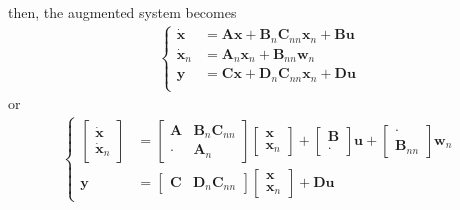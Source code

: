 \documentclass[letterpaper,10pt,english]{jupyterBook}
\begin{document}
then, the augmented system becomes
\begin{equation*}
\begin{split}\left\{\begin{aligned}
  \dot{\mathbf{x}} & = \mathbf{A} \mathbf{x} + \mathbf{B}_n \mathbf{C}_{nn} \mathbf{x}_n + \mathbf{B} \mathbf{u} \\
  \dot{\mathbf{x}}_n & = \mathbf{A}_{n}  \mathbf{x}_n + \mathbf{B}_{nn} \mathbf{w}_n  \\
       \mathbf{y}  & = \mathbf{C} \mathbf{x} + \mathbf{D}_n \mathbf{C}_{nn} \mathbf{x}_n + \mathbf{D} \mathbf{u} \\
\end{aligned}\right.\end{split}
\end{equation*}
\sphinxAtStartPar
or
\begin{equation*}
\begin{split}\left\{\begin{aligned}
  \begin{bmatrix} \dot{\mathbf{x}} \\ \dot{\mathbf{x}}_n \end{bmatrix} & =
  \begin{bmatrix} \mathbf{A} & \mathbf{B}_n \mathbf{C}_{nn} \\ \cdot & \mathbf{A}_n \end{bmatrix}
  \begin{bmatrix}      \mathbf{x}  \\      \mathbf{x}_n \end{bmatrix} 
  + \begin{bmatrix} \mathbf{B} \\ \cdot \end{bmatrix} \mathbf{u} + \begin{bmatrix} \cdot \\ \mathbf{B}_{nn} \end{bmatrix} \mathbf{w}_n \\
  \mathbf{y} & = \begin{bmatrix} \mathbf{C} & \mathbf{D}_n \mathbf{C}_{nn} \end{bmatrix} \begin{bmatrix} \mathbf{x} \\ \mathbf{x}_{n} \end{bmatrix} + \mathbf{D} \mathbf{u}
\end{aligned}\right.\end{split}
\end{equation*}
\end{document}
